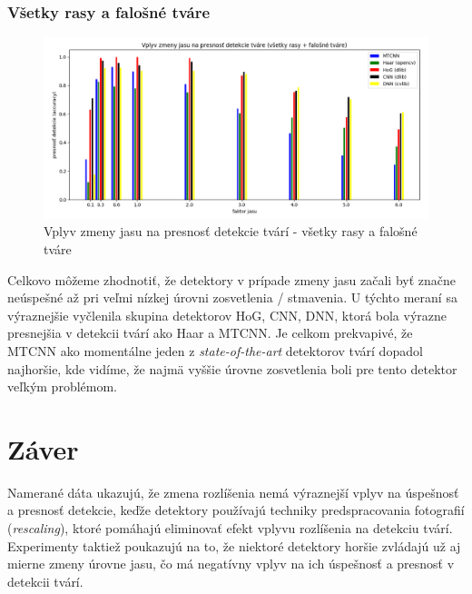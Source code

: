 \documentclass[]{article}
\begin{document}
	\subsubsection*{Všetky rasy a falošné tváre}
	\begin{figure}[h!]
		\includegraphics[width=\textwidth]{Vysledky_jas/all/Figure_1.png}
		\caption{Vplyv zmeny jasu na presnosť detekcie tvárí - všetky rasy a falošné tváre}
	\end{figure}

	Celkovo môžeme zhodnotiť, že detektory v prípade zmeny jasu začali byť značne neúspešné až pri veľmi nízkej úrovni zosvetlenia / stmavenia. U týchto meraní sa výraznejšie vyčlenila skupina detektorov HoG, CNN, DNN, ktorá bola výrazne presnejšia v detekcii tvárí ako Haar a MTCNN. Je celkom prekvapivé, že MTCNN ako momentálne jeden z \textit{state-of-the-art} detektorov tvárí dopadol najhoršie, kde vidíme, že najmä vyššie úrovne zosvetlenia boli pre tento detektor veľkým problémom.
	
	\section{Záver}
	
	Namerané dáta ukazujú, že zmena rozlíšenia nemá výraznejší vplyv na úspešnosť a presnosť detekcie, keďže detektory používajú techniky predspracovania fotografií (\textit{rescaling}), ktoré pomáhajú eliminovať efekt vplyvu rozlíšenia na detekciu tvárí. Experimenty taktiež poukazujú na to, že niektoré detektory horšie zvládajú už aj mierne zmeny úrovne jasu, čo má negatívny vplyv na ich úspešnosť a presnosť v detekcii tvárí.
	
	
\end{document}
